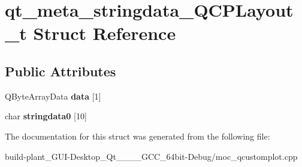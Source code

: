 \hypertarget{structqt__meta__stringdata__QCPLayout__t}{}\section{qt\+\_\+meta\+\_\+stringdata\+\_\+\+Q\+C\+P\+Layout\+\_\+t Struct Reference}
\label{structqt__meta__stringdata__QCPLayout__t}
\subsection*{Public Attributes}
\begin{DoxyCompactItemize}
\item 
\mbox{\label{structqt__meta__stringdata__QCPLayout__t_a133fdcad1faf8247b373a50c8dcb604f}} 
Q\+Byte\+Array\+Data {\bfseries data} \mbox{[}1\mbox{]}
\item 
\mbox{\label{structqt__meta__stringdata__QCPLayout__t_ad487cc776f3a79ee6a9f10c234b3ade0}} 
char {\bfseries stringdata0} \mbox{[}10\mbox{]}
\end{DoxyCompactItemize}


The documentation for this struct was generated from the following file\+:\begin{DoxyCompactItemize}
\item 
build-\/plant\+\_\+\+G\+U\+I-\/\+Desktop\+\_\+\+Qt\+\_\+\_\+\_\+\_\+\+G\+C\+C\+\_\+64bit-\/\+Debug/moc\+\_\+qcustomplot.\+cpp\end{DoxyCompactItemize}
